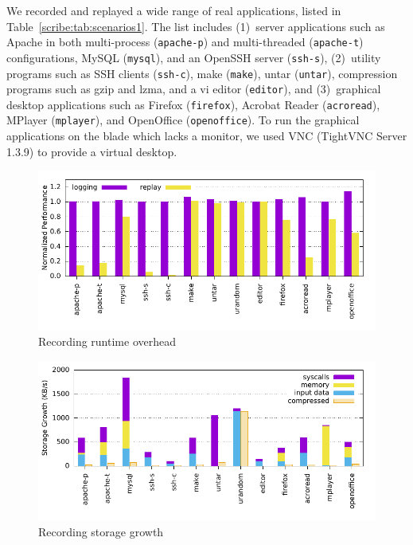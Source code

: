 \begin{table}[]
We recorded and replayed a wide range of real applications, listed in
Table~\ref{scribe:tab:scenarios1}.
The list includes (1)~server applications
such as Apache in both multi-process ({\tt apache-p}) and multi-threaded
({\tt apache-t}) configurations, MySQL ({\tt mysql}), and an
OpenSSH server ({\tt ssh-s}), (2)~utility programs such as
SSH clients ({\tt ssh-c}), make ({\tt make}), untar ({\tt untar}),
compression programs such as gzip and lzma, and a vi editor
({\tt editor}), and (3)~graphical desktop applications such as
Firefox ({\tt firefox}), Acrobat Reader ({\tt acroread}), MPlayer
({\tt mplayer}), and OpenOffice ({\tt openoffice}). To run the graphical
applications on the blade which lacks a monitor, we used VNC
(TightVNC Server 1.3.9) to provide a virtual desktop. 


\begin{figure}[t]
  \centering
  \includegraphics[width=\linewidth]{figures/scribe/overhead}
  \vspace{-5em}
  \caption{Recording runtime overhead}
  \label{scribe:fig:overhead}
\end{figure}

\begin{figure}[t]
    \centering
    \includegraphics[width=\linewidth]{figures/scribe/storage}
  \vspace{-5em}
    \caption{Recording storage growth}
    \label{scribe:fig:storage}
\end{figure}


\end{table}
